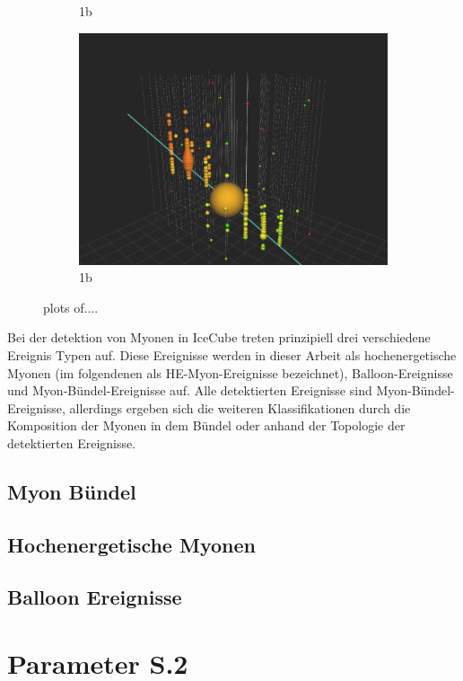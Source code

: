 \begin{figure}
\begin{subfigure}{.33\textwidth}
  \caption{1b}
  \label{fig:sfig2}
\end{subfigure}
\begin{subfigure}{.33\textwidth}
  \centering
  \includegraphics[width=\textwidth]{./Plots/Balloon.png}
  \caption{1b}
  \label{fig:sfig2}
\end{subfigure}
\caption{plots of....}
\label{fig:fig}
\end{figure}
Bei der detektion von Myonen in IceCube treten prinzipiell drei verschiedene Ereignis Typen auf. Diese Ereignisse werden in dieser Arbeit als hochenergetische Myonen (im folgendenen als HE-Myon-Ereignisse bezeichnet), Balloon-Ereignisse und Myon-Bündel-Ereignisse auf. Alle detektierten Ereignisse sind Myon-Bündel-Ereignisse, allerdings ergeben sich die weiteren Klassifikationen durch die Komposition der Myonen in dem Bündel oder anhand der Topologie der detektierten Ereignisse.
\subsection{Myon Bündel}

\subsection{Hochenergetische Myonen}
\subsection{Balloon Ereignisse}
\section{Parameter S.2}
